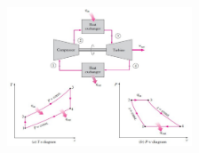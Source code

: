 \documentclass[10pt,compress]{beamer}
\begin{document}
\begin{frame}
\begin{columns}
\begin{column}[c]{0.5\linewidth}
\begin{enumerate}[(1)]
   \end{enumerate}
  \end{column}
  \begin{column}[c]{0.5\linewidth}
    \begin{center}
   \begin{figure}%
     \includegraphics[height=5.cm,width=5.5cm,clip]{./Pics/Brayton_cycle1}
   \end{figure}  
    \end{center} 
  \end{column}  
 \end{columns}
\end{frame}
\end{document}

